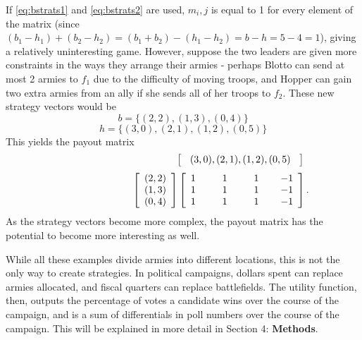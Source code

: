 \documentclass[11pt]{article}
\begin{document}
If \eqref{eq:bstrats1} and \eqref{eq:bstrats2} are used, $m_i,j$ is equal
to 1 for every element of the matrix (since
$(b_1-h_1)+(b_2-h_2)=(b_1+b_2)-(h_1-h_2)=b-h=5-4=1$), giving a relatively
uninteresting game. However, suppose the two leaders are given more
constraints in the ways they arrange their armies - perhaps Blotto can
send at most 2 armies to $f_1$ due to the difficulty of moving troops,
and Hopper can gain two extra armies from an ally if she sends all of her
troops to $f_2$. These new strategy vectors would be
\begin{equation*}
b = \{(2,2), (1,3), (0,4)\}
\end{equation*}
\begin{equation*}
h = \{(3,0), (2,1), (1,2), (0,5)\}
\end{equation*}
This yields the payout matrix
\begin{align*}
\setlength\arraycolsep{9pt}
\hphantom{++++++++++++}\left[{\begin{array}{cccc}
(3,0), (2,1), (1,2), (0,5) \\
\end{array} } \right]
\end{align*}
\begin{equation*}\hphantom{++++++++}
\left[ {\begin{array}{c}
(2,2) \\
(1,3) \\
(0,4) \\
\end{array} } \right]
\left[ {\begin{array}{cccc}
1\hphantom{(,0)} & 1\hphantom{(,0)} & 1\hphantom{(,)} & -1 \\
1\hphantom{(,0)} & 1\hphantom{(,0)} & 1\hphantom{(,)} & -1 \\
1\hphantom{(,0)} & 1\hphantom{(,0)} & 1\hphantom{(,)} & -1 \\
\end{array} } \right].
\end{equation*}
As the strategy vectors become more complex, the payout matrix has the
potential to become more interesting as well.

While all these examples divide armies into different locations, this
is not the only way to create strategies. In political campaigns,
dollars spent can replace armies allocated, and fiscal quarters can
replace battlefields. The utility function, then, outputs the
percentage of votes a candidate wins over the course of the campaign,
and is a sum of differentials in poll numbers over the course of the
campaign. This will be explained in more detail in Section 4:
\textbf{Methods}.
\end{document}
